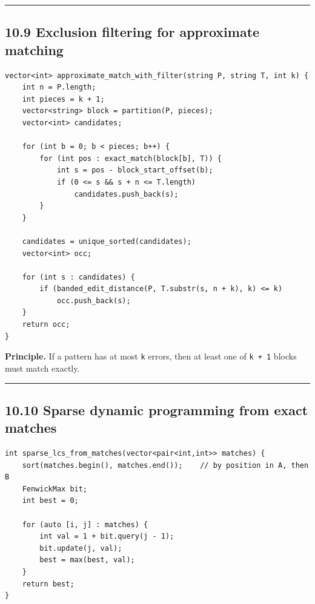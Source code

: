 \documentclass[11pt]{article}
\begin{document}
\begin{center}\rule{0.5\linewidth}{0.5pt}\end{center}

\subsection{10.9 Exclusion filtering for approximate matching}\label{exclusion-filtering-for-approximate-matching}

\begin{verbatim}
vector<int> approximate_match_with_filter(string P, string T, int k) {
    int n = P.length;
    int pieces = k + 1;
    vector<string> block = partition(P, pieces);
    vector<int> candidates;

    for (int b = 0; b < pieces; b++) {
        for (int pos : exact_match(block[b], T)) {
            int s = pos - block_start_offset(b);
            if (0 <= s && s + n <= T.length)
                candidates.push_back(s);
        }
    }

    candidates = unique_sorted(candidates);
    vector<int> occ;

    for (int s : candidates) {
        if (banded_edit_distance(P, T.substr(s, n + k), k) <= k)
            occ.push_back(s);
    }
    return occ;
}
\end{verbatim}

\textbf{Principle.} If a pattern has at most \texttt{k} errors, then at least one of \texttt{k + 1} blocks must match exactly.

\begin{center}\rule{0.5\linewidth}{0.5pt}\end{center}

\subsection{10.10 Sparse dynamic programming from exact matches}\label{sparse-dynamic-programming-from-exact-matches}

\begin{verbatim}
int sparse_lcs_from_matches(vector<pair<int,int>> matches) {
    sort(matches.begin(), matches.end());    // by position in A, then B
    FenwickMax bit;
    int best = 0;

    for (auto [i, j] : matches) {
        int val = 1 + bit.query(j - 1);
        bit.update(j, val);
        best = max(best, val);
    }
    return best;
}
\end{verbatim}
\end{document}
